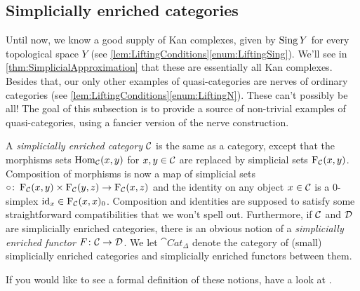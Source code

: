 \subsection{Simplicially enriched categories}
Until now, we know a good supply of Kan complexes, given by $\operatorname{Sing} Y$ for every topological space $Y$ (see \cref{lem:LiftingConditions}\cref{enum:LiftingSing}). We'll see in \cref{thm:SimplicialApproximation} that these are essentially all Kan complexes. Besides that, our only other examples of quasi-categories are nerves of ordinary categories (see \cref{lem:LiftingConditions}\cref{enum:LiftingN}). These can't possibly be all! The goal of this subsection is to provide a source of non-trivial examples of quasi-categories, using a fancier version of the nerve construction.
\begin{numpar}
	A \emph{simplicially enriched category} $\mathcal{C}$ is the same as a category, except that the morphisms sets $\operatorname{Hom}_{\mathcal{C}}(x,y)$ for $x,y\in\mathcal{C}$ are replaced by simplicial sets $\operatorname{F}_{\mathcal{C}}(x,y)$. Composition of morphisms is now a map of simplicial sets $\circ\colon \operatorname{F}_{\mathcal{C}}(x,y)\times\operatorname{F}_{\mathcal{C}}(y,z)\rightarrow\operatorname{F}_{\mathcal{C}}(x,z)$ and the identity on any object $x\in\mathcal{C}$ is a $0$-simplex $\operatorname{id}_x\in\operatorname{F}_{\mathcal{C}}(x,x)_0$. Composition and identities are supposed to satisfy some straightforward compatibilities that we won't spell out. Furthermore, if $\mathcal{C}$ and $\mathcal{D}$ are simplicially enriched categories, there is an obvious notion of a \emph{simplicially enriched functor $F\colon \mathcal{C}\rightarrow\mathcal{D}$}. We let $\cat{Cat}_\Delta$ denote the category of (small) simplicially enriched categories and simplicially enriched functors between them. 
	
	If you would like to see a formal definition of these notions, have a look at \cite[Definitions~1.2.34 and~1.2.35]{Land}.
\end{numpar}
